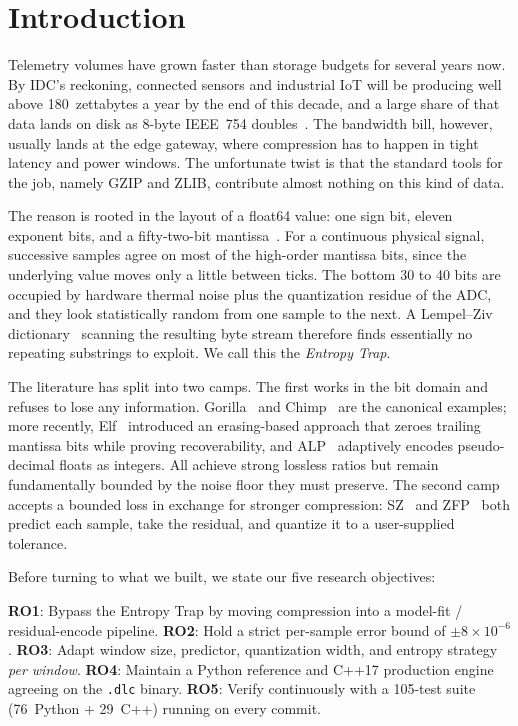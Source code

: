 \documentclass[runningheads]{llncs}
\begin{document}
\section{Introduction}
\label{sec:intro}

Telemetry volumes have grown faster than storage budgets for several years now. By IDC's reckoning, connected sensors and industrial IoT will be producing well above 180~zettabytes a year by the end of this decade, and a large share of that data lands on disk as 8-byte IEEE~754 doubles~\cite{reinsel2018}. The bandwidth bill, however, usually lands at the edge gateway, where compression has to happen in tight latency and power windows. The unfortunate twist is that the standard tools for the job, namely GZIP and ZLIB, contribute almost nothing on this kind of data.

The reason is rooted in the layout of a float64 value: one sign bit, eleven exponent bits, and a fifty-two-bit mantissa~\cite{ieee754}. For a continuous physical signal, successive samples agree on most of the high-order mantissa bits, since the underlying value moves only a little between ticks. The bottom 30 to 40 bits are occupied by hardware thermal noise plus the quantization residue of the ADC, and they look statistically random from one sample to the next. A Lempel--Ziv dictionary~\cite{ziv1977} scanning the resulting byte stream therefore finds essentially no repeating substrings to exploit. We call this the \emph{Entropy Trap}.

The literature has split into two camps. The first works in the bit domain and refuses to lose any information. Gorilla~\cite{gorilla2015} and Chimp~\cite{chimp2022} are the canonical examples; more recently, Elf~\cite{elf2023} introduced an erasing-based approach that zeroes trailing mantissa bits while proving recoverability, and ALP~\cite{alp2024} adaptively encodes pseudo-decimal floats as integers. All achieve strong lossless ratios but remain fundamentally bounded by the noise floor they must preserve. The second camp accepts a bounded loss in exchange for stronger compression: SZ~\cite{sz2016,sz3_2023} and ZFP~\cite{zfp2014} both predict each sample, take the residual, and quantize it to a user-supplied tolerance.

Before turning to what we built, we state our five research objectives:

\textbf{RO1}: Bypass the Entropy Trap by moving compression into a model-fit / residual-encode pipeline.
\textbf{RO2}: Hold a strict per-sample error bound of $\pm 8 \times 10^{-6}$.
\textbf{RO3}: Adapt window size, predictor, quantization width, and entropy strategy \emph{per window}.
\textbf{RO4}: Maintain a Python reference and C++17 production engine agreeing on the \texttt{.dlc} binary.
\textbf{RO5}: Verify continuously with a 105-test suite (76~Python + 29~C++) running on every commit.
\end{document}
